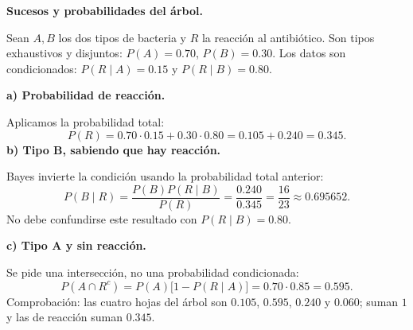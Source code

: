 \textbf{Sucesos y probabilidades del árbol.}\par\nopagebreak[4]
Sean $A,B$ los dos tipos de bacteria y $R$ la reacción al antibiótico. Son tipos exhaustivos y disjuntos: $P(A)=0.70$, $P(B)=0.30$. Los datos son condicionados: $P(R\mid A)=0.15$ y $P(R\mid B)=0.80$.

\textbf{a) Probabilidad de reacción.}\par\nopagebreak[4]
Aplicamos la probabilidad total:
\[
\boxed{P(R)=0.70\cdot0.15+0.30\cdot0.80=0.105+0.240=0.345.}
\]
\textbf{b) Tipo B, sabiendo que hay reacción.}\par\nopagebreak[4]
Bayes invierte la condición usando la probabilidad total anterior:
\[
\boxed{P(B\mid R)=\frac{P(B)P(R\mid B)}{P(R)}
=\frac{0.240}{0.345}=\frac{16}{23}\approx0.695652.}
\]
No debe confundirse este resultado con $P(R\mid B)=0.80$.

\textbf{c) Tipo A y sin reacción.}\par\nopagebreak[4]
Se pide una intersección, no una probabilidad condicionada:
\[
\boxed{P(A\cap R^c)=P(A)\bigl[1-P(R\mid A)\bigr]
=0.70\cdot0.85=0.595.}
\]
Comprobación: las cuatro hojas del árbol son $0.105$, $0.595$, $0.240$ y $0.060$; suman $1$ y las de reacción suman $0.345$.
